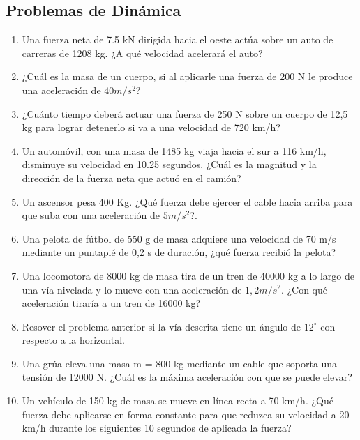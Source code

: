 \subsection{Problemas de Dinámica}

\begin{enumerate}
 \item Una fuerza neta de 7.5 kN dirigida hacia el oeste actúa sobre un auto de carreras de 1208 kg. ¿A qué velocidad acelerará 
el auto?

\item  ¿Cuál es la masa de un cuerpo, si
 al aplicarle una fuerza de 200 N le produce una aceleración de $40 m/s^2$?

\item  ¿Cuánto tiempo deberá actuar
 una fuerza de 250 N sobre un cuerpo de 12,5 kg para lograr detenerlo si va a una velocidad 
de
 720 km/h?

 \item Un automóvil, con una masa de 1485 kg viaja hacia el sur a 116 km/h, disminuye su velocidad en 10.25 segundos. ¿Cuál es la 
magnitud y la dirección de la fuerza neta que actuó en el camión?

\item Un ascensor pesa 400 Kg. ¿Qué fuerza debe ejercer el cable hacia arriba para que suba con una aceleración de $5 m/s^2$?.

\item Una pelota de fútbol de 550 g de masa adquiere una
 velocidad de 70 m/s mediante un puntapié de 0,2 s de duración, ¿qué 
fuerza recibió la pelota?

\item Una locomotora de 8000 kg de masa tira de un tren de 40000 kg a lo largo de una vía nivelada y lo mueve con una aceleración 
de $1,2 m/s^2$. ¿Con qué aceleración tiraría a un tren de 16000 kg?

\item Resover el problema anterior si la vía descrita tiene un ángulo de $12^\circ$ con respecto a la horizontal.

\item  Una grúa eleva una masa m = 800 kg
 mediante un cable que soporta una tensión de 12000 N. ¿Cuál es la máxima aceleración 
con que
 se puede elevar?

\item Un vehículo de 150 kg de masa se mueve en línea recta a 70 km/h. ¿Qué fuerza debe aplicarse en forma constante para que 
reduzca su velocidad a 20 km/h durante los siguientes 10 segundos de aplicada la fuerza?


\end{enumerate}
